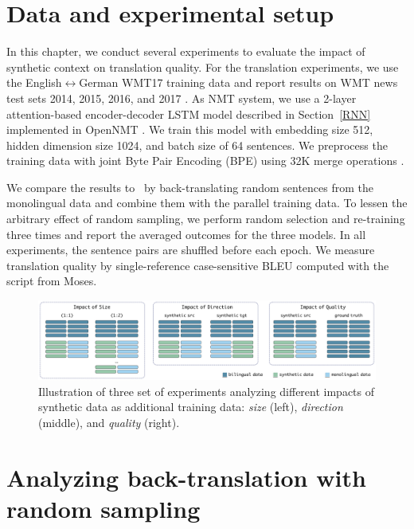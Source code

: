 \section{Data and experimental setup} \label{btdata}

In this chapter, we conduct several experiments to evaluate the impact of synthetic context on translation quality. 
For the translation experiments, we use the English$\leftrightarrow$German WMT17 training data and report results on WMT news test sets 2014, 2015, 2016, and 2017 \citep{bojar-EtAl:2017:WMT1}. 
%
As NMT system, we use a 2-layer attention-based encoder-decoder LSTM model described in Section~\ref{RNN} implemented in OpenNMT \citep{2017opennmt}.
We train this model with embedding size 512, hidden dimension size 1024, and batch size of 64 sentences.
We preprocess the training data with joint Byte Pair Encoding (BPE) using 32K merge operations \citep{sennrich-haddow-birch:2016:P16-12}. 

We compare the results to~\citet{sennrich-haddow-birch:2016:P16-11} by back-translating random sentences from the monolingual data and combine them with the parallel training data.
To lessen the arbitrary effect of random sampling, we perform random selection and re-training three times and report the averaged outcomes for the three models.
In all experiments, the sentence pairs are shuffled before each epoch.
We measure translation quality by single-reference case-sensitive {BLEU} \citep{Papineni2001} computed with the  script from Moses.


\begin{figure}[htb!]
\begin{center}
\includegraphics[width=\textwidth]{05-research-03/figs/bttypes.pdf}
\caption{Illustration of three set of experiments analyzing different impacts of synthetic data as additional training data: \textit{size} (left), \textit{direction} (middle), and \textit{quality} (right). %
}
\label{btmets}
\end{center}
\end{figure}


\section{Analyzing back-translation with random sampling} \label{btbtanalysis}

